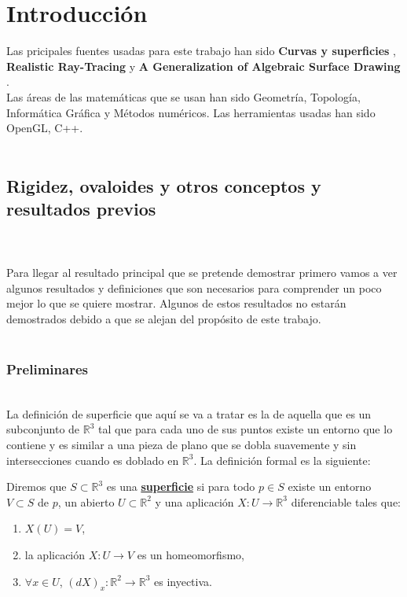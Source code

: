\chapter{Introducción}

Las pricipales fuentes usadas para este trabajo han sido \textbf{Curvas y superficies} \cite{MonRos}, \textbf{Realistic Ray-Tracing} \cite{Shirley} y \textbf{A Generalization of Algebraic Surface Drawing} \cite{Blinn}.
${ }$\\

Las áreas de las matemáticas que se usan han sido Geometría, Topología, Informática Gráfica y Métodos numéricos. Las herramientas usadas han sido OpenGL, C++.
${ }$\\

${ }$\\
\section{Rigidez, ovaloides y otros conceptos y resultados previos}
${ }$\\
${ }$\\


Para llegar al resultado principal que se pretende demostrar primero vamos a ver algunos resultados y definiciones que son necesarios para comprender un poco mejor lo que se quiere mostrar. Algunos de estos resultados no estarán demostrados debido a que se alejan del propósito de este trabajo.
${ }$\\



${ }$\\
\subsection{Preliminares}
${ }$\\


La definición de superficie que aquí se va a tratar es la de aquella que es un subconjunto de $\mathbb{R}^3$ tal que para cada uno de sus puntos existe un entorno que lo contiene y es similar a una pieza de plano que se dobla suavemente y sin intersecciones cuando es doblado en $\mathbb{R}^3$. La definición formal es la siguiente:
${ }$\\

\begin{definicion}
	Diremos que $S \subset \mathbb{R}^3$ es una \underline{\textbf{superficie}} si para todo $p \in S$ existe un entorno $V \subset S$ de $p$, un abierto $U \subset \mathbb{R}^2$ y una aplicación $X : U \to \mathbb{R}^3$ diferenciable tales que:
	\begin{enumerate}
		\item $X(U) = V$,
		\item la aplicación $X : U \to V$ es un homeomorfismo,
		\item $\forall x \in U$, $(dX)_x : \mathbb{R}^2 \to \mathbb{R}^3$ es inyectiva.
	\end{enumerate}
\end{definicion}
${ }$\\

